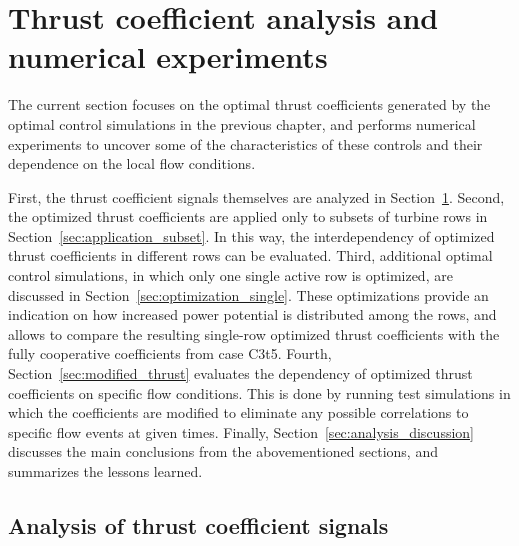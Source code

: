 \section{Thrust coefficient analysis and numerical experiments}\label{sec:analysis_controls_analysis}
	
	The current section focuses on the optimal thrust coefficients generated by the optimal control simulations in the previous chapter, and performs numerical experiments to uncover some of the characteristics of these controls and their dependence on the local flow conditions. 
	
	First, the thrust coefficient signals themselves are analyzed in Section~\ref{sec:analysis_controls_analysis}. Second, the optimized thrust coefficients are applied only to subsets of turbine rows in Section~\ref{sec:application_subset}. In this way, the interdependency of optimized thrust coefficients in different rows can be evaluated. Third, additional optimal control simulations, in which only one single active row is optimized, are discussed in Section~\ref{sec:optimization_single}. These optimizations provide an indication on how increased power potential is distributed among the rows, and allows to compare the resulting single-row optimized thrust coefficients with the fully cooperative coefficients from case C3t5. Fourth, Section~\ref{sec:modified_thrust} evaluates the dependency of optimized thrust coefficients on specific flow conditions. This is done by running test simulations in which the coefficients are modified to eliminate any possible correlations to specific flow events at given times. Finally, Section~\ref{sec:analysis_discussion} discusses the main conclusions from the abovementioned sections, and summarizes the lessons learned.
	
	\subsection{Analysis of thrust coefficient signals}\label{sec:analysis_thrust}
	
